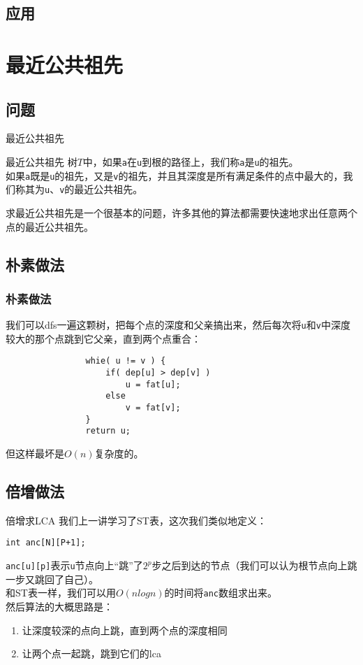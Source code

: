 \documentclass{beamer}
\begin{document}
		\subsection{应用}
	\section{最近公共祖先}
		\subsection{问题}
			\begin{frame}{最近公共祖先}
				\begin{definition}{最近公共祖先}
					树$T$中，如果\texttt{a}在\texttt{u}到根的路径上，我们称\texttt{a}是\texttt{u}的祖先。\\
					如果\texttt{a}既是\texttt{u}的祖先，又是\texttt{v}的祖先，并且其深度是所有满足条件的点中最大的，我们称其为\texttt{u}、\texttt{v}的最近公共祖先。
				\end{definition}
				求最近公共祖先是一个很基本的问题，许多其他的算法都需要快速地求出任意两个点的最近公共祖先。
			\end{frame}
		\subsection{朴素做法}
			\begin{frame}[fragile=singleslide]
				\frametitle{朴素做法}
				我们可以dfs一遍这颗树，把每个点的深度和父亲搞出来，然后每次将\texttt{u}和\texttt{v}中深度较大的那个点跳到它父亲，直到两个点重合：
				\begin{verbatim}
				whie( u != v ) {
				    if( dep[u] > dep[v] ) 
				        u = fat[u];
				    else
				        v = fat[v];
				}
				return u;
				\end{verbatim} 
				但这样最坏是$O(n)$复杂度的。
			\end{frame}
		\subsection{倍增做法}
			\begin{frame}{倍增求LCA}
				我们上一讲学习了ST表，这次我们类似地定义：\\
				\begin{center}
					\texttt{int anc[N][P+1];}	\\
				\end{center}
				\texttt{anc[u][p]}表示\texttt{u}节点向上“跳”了$2^p$步之后到达的节点（我们可以认为根节点向上跳一步又跳回了自己）。\\
				和ST表一样，我们可以用$O(nlogn)$的时间将\texttt{anc}数组求出来。\\
				然后算法的大概思路是：
				\begin{enumerate}
					\item 让深度较深的点向上跳，直到两个点的深度相同
					\item 让两个点一起跳，跳到它们的lca
				\end{enumerate}
			\end{frame}
\end{document}
